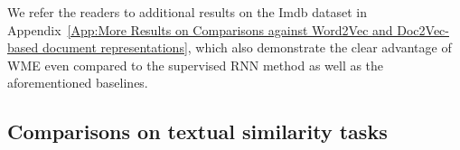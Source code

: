 \documentclass[11pt,a4paper]{article}
\newcommand{\1}{\boldsymbol{1}}
\begin{document}
We refer the readers to additional results on the Imdb dataset in Appendix~\ref{App:More Results on Comparisons against Word2Vec and Doc2Vec-based document representations}, 
which also demonstrate the clear advantage of WME even compared to the supervised RNN method as well as the aforementioned baselines. 




\subsection{Comparisons on textual similarity tasks}
\label{sec:Comparisons for performing textual similarity tasks}
\end{document}
